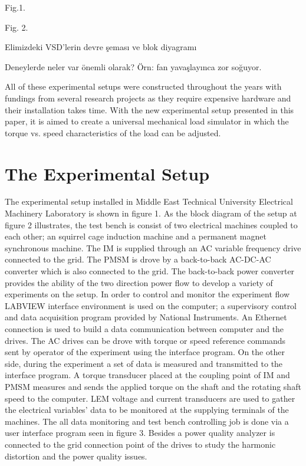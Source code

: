 \documentclass[journal]{IEEEtran}
\begin{document}
Fig.1.

Fig. 2.

Elimizdeki VSD'lerin devre şeması ve blok diyagramı

Deneylerde neler var önemli olarak? Örn: fan yavaşlayınca zor soğuyor.

All of these experimental setups were constructed throughout the years with fundings from several research projects as they require expensive hardware and their installation takes time. With the new experimental setup presented in this paper, it is aimed to create a universal mechanical load simulator in which the torque vs. speed characteristics of the load can be adjusted.



\section{The Experimental Setup}


The experimental setup installed in Middle East Technical University Electrical Machinery Laboratory is shown in figure 1.
As the block diagram of the setup at figure 2 illustrates, the test bench is consist of two electrical machines coupled to each other; an squirrel cage induction machine and a permanent magnet synchronous machine. The IM is supplied through an AC variable frequency drive connected to the grid. The PMSM is drove by a back-to-back AC-DC-AC converter which is also connected to the grid. The back-to-back power converter provides the ability of the two direction power flow to develop a variety of experiments on the setup.
In order to control and monitor the experiment flow LABVIEW interface environment is used on the computer; a supervisory control and data acquisition program provided by National Instruments. An Ethernet connection is used to build a data communication between computer and the drives. The AC drives can be drove with torque or speed reference commands sent by operator of the experiment using the interface program. On the other side, during the experiment a set of data is measured and transmitted to the interface program. A torque transducer placed at the coupling point of IM and PMSM measures and sends the applied torque on the shaft and the rotating shaft speed to the computer. LEM voltage and current transducers are used to gather the electrical variables' data to be monitored at the supplying terminals of the machines. The all data monitoring and test bench controlling job is done via a user interface program seen in figure 3.
Besides a power quality analyzer is connected to the grid connection point of the drives to study the harmonic distortion and the power quality issues.
\end{document}
